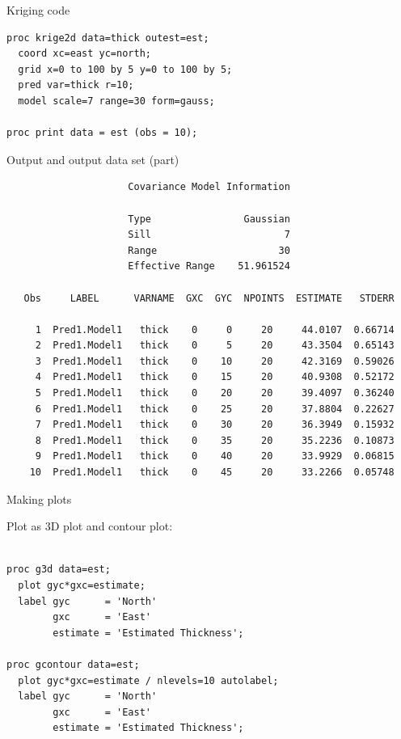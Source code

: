 \begin{frame}[fragile]{Kriging code}

\begin{verbatim}
proc krige2d data=thick outest=est; 
  coord xc=east yc=north; 
  grid x=0 to 100 by 5 y=0 to 100 by 5; 
  pred var=thick r=10; 
  model scale=7 range=30 form=gauss; 

proc print data = est (obs = 10);

\end{verbatim}
  
\end{frame}

\begin{frame}[fragile]{Output and output data set (part)}

{\scriptsize
\begin{verbatim}
                     Covariance Model Information

                     Type                Gaussian
                     Sill                       7
                     Range                     30
                     Effective Range    51.961524

   Obs     LABEL      VARNAME  GXC  GYC  NPOINTS  ESTIMATE   STDERR

     1  Pred1.Model1   thick    0     0     20     44.0107  0.66714
     2  Pred1.Model1   thick    0     5     20     43.3504  0.65143
     3  Pred1.Model1   thick    0    10     20     42.3169  0.59026
     4  Pred1.Model1   thick    0    15     20     40.9308  0.52172
     5  Pred1.Model1   thick    0    20     20     39.4097  0.36240
     6  Pred1.Model1   thick    0    25     20     37.8804  0.22627
     7  Pred1.Model1   thick    0    30     20     36.3949  0.15932
     8  Pred1.Model1   thick    0    35     20     35.2236  0.10873
     9  Pred1.Model1   thick    0    40     20     33.9929  0.06815
    10  Pred1.Model1   thick    0    45     20     33.2266  0.05748
\end{verbatim}
  }

\end{frame}

\begin{frame}[fragile]{Making plots}

Plot as 3D plot and contour plot:

\begin{verbatim}
    
proc g3d data=est;
  plot gyc*gxc=estimate;
  label gyc      = 'North' 
        gxc      = 'East' 
        estimate = 'Estimated Thickness'; 

proc gcontour data=est;
  plot gyc*gxc=estimate / nlevels=10 autolabel;
  label gyc      = 'North' 
        gxc      = 'East' 
        estimate = 'Estimated Thickness'; 


\end{verbatim}


  
\end{frame}

